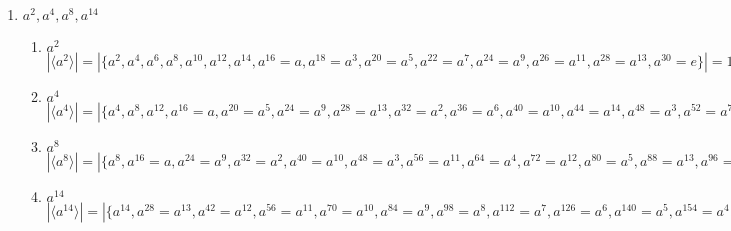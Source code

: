 \documentclass{article}
\begin{document}
\begin{enumerate}
\begin{enumerate}
        \item $a^2, a^4, a^8, a^{14}$
        \begin{enumerate}
            \item $a^2$ \newline
        $|\langle a^2\rangle| = |\{a^2, a^4, a^6, a^8, a^{10}, a^{12}, a^{14}, a^{16}=a, a^{18}=a^3, a^{20}=a^5, a^{22}=a^7, a^{24}=a^9, a^{26}=a^{11}, a^{28}=a^{13}, a^{30}=e\}| = 15$
            \item $a^4$ \newline
        $|\langle a^4\rangle| = |\{a^4, a^8, a^{12}, a^{16}=a, a^{20}=a^5, a^{24}=a^9, a^{28}=a^{13}, a^{32}=a^2, a^{36}=a^6, a^{40}=a^{10}, a^{44}=a^{14}, a^{48}=a^3, a^{52}=a^7, a^{56}=a^{11}, a^{60}=e\}| = 15$
            \item $a^8$ \newline
        $|\langle a^8\rangle| = |\{a^8, a^{16}=a, a^{24}=a^9, a^{32}=a^2, a^{40}=a^{10}, a^{48}=a^3, a^{56}=a^{11}, a^{64}=a^4, a^{72}=a^{12}, a^{80}=a^5, a^{88}=a^{13}, a^{96}=a^6, a^{104}=a^{14}, a^{112}=a^7, a^{120}=e\}| = 15$
            \item $a^{14}$ \newline
        $|\langle a^{14}\rangle| = |\{a^{14}, a^{28}=a^{13}, a^{42}=a^{12}, a^{56}=a^{11}, a^{70}=a^{10}, a^{84}=a^9, a^{98}=a^8, a^{112}=a^7, a^{126}=a^6, a^{140}=a^5, a^{154}=a^4, a^{168}=a^3, a^{182}=a^2, a^{196}=a, a^{210}=e\}| = 15$
        \end{enumerate}
    \end{enumerate}
\end{enumerate}
\end{document}
